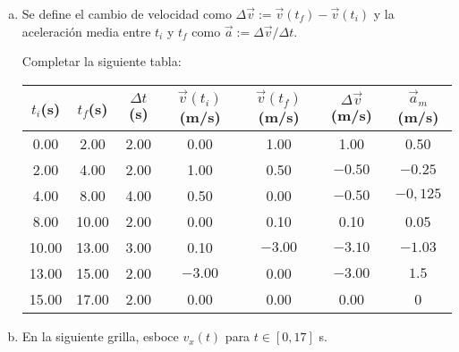 \documentclass[12pt,tikz,border=3.14mm]{article}
\begin{document}
\begin{enumerate}[a), leftmargin=1cm]
\begin{center}
			\end{center}
			\item Se define el cambio de velocidad como $\Delta \vec{v} := \vec{v}(t_{f})- \vec{v}(t_{i})$ y la aceleración media entre $t_i$ y $t_f$ como $\vec{a} := \Delta \vec{v} / \Delta t$.
			
			Completar la siguiente tabla:
			\begin{center}
				\begin{tabular}{|c|c|c|c|c|c|c|}
					\hline 
					$t_{i}$(s) &  $t_{f}$(s) & $\Delta t$(s)  & $\vec{v}(t_{i})$(m/s) & $\vec{v}(t_{f})$(m/s) & $\Delta \vec{v}$(m/s) & $\vec{a}_{m}$(m/s) \\ \hline
					\color{blue} 0.00 & \color{blue} 2.00 & 2.00 &0.00 & 1.00 & 1.00 & 0.50 \\ \hline
					\color{blue} 2.00 & \color{blue} 4.00 & 2.00 &1.00  & 0.50 & $-0.50$ & $-0.25$ \\ \hline
					\color{blue} 4.00 & \color{blue} 8.00 & 4.00 & 0.50 & 0.00 & $-0.50$ & $-0,125$ \\ \hline
					\color{blue} 8.00 & \color{blue} 10.00 & 2.00 & 0.00 & 0.10& 0.10 &  0.05 \\ \hline
					\color{blue} 10.00 & \color{blue} 13.00 & 3.00 & 0.10 & $-3.00$ & $-3.10 $ & $-1.03$ \\ \hline
					\color{blue} 13.00 & \color{blue} 15.00 & 2.00 & $-3.00$  & 0.00 & $-3.00$ & $1.5$ \\ \hline
					\color{blue} 15.00 & \color{blue} 17.00 & 2.00 & 0.00 & 0.00 & 0.00 & 0 \\ \hline
				\end{tabular}	
				
			\end{center}
\newpage
			\item En la siguiente grilla, esboce $v_{x}(t)$ para $t \in [0,17]$ s.
			\begin{center}
			

\end{center}
\end{enumerate}
\end{document}
